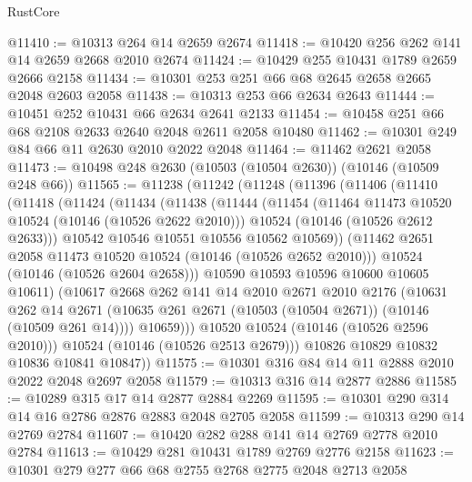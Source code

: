\begin{lexlean}{RustCore}
\begin{coremodule}
@11410 := @10313 @264 @14 @2659 @2674
@11418 := @10420 @256 @262 @141 @14 @2659 @2668 @2010 @2674
@11424 := @10429 @255 @10431 @1789 @2659 @2666 @2158
@11434 := @10301 @253 @251 @66 @68 @2645 @2658 @2665 @2048 @2603 @2058
@11438 := @10313 @253 @66 @2634 @2643
@11444 := @10451 @252 @10431 @66 @2634 @2641 @2133
@11454 := @10458 @251 @66 @68 @2108 @2633 @2640 @2048 @2611 @2058 @10480
@11462 := @10301 @249 @84 @66 @11 @2630 @2010 @2022 @2048
@11464 := @11462 @2621 @2058
@11473 := @10498 @248 @2630 (@10503 (@10504 @2630)) (@10146 (@10509 @248 @66))
@11565 := @11238
    (@11242
      (@11248
        (@11396
          (@11406
            (@11410
              (@11418
                (@11424
                  (@11434
                    (@11438
                      (@11444
                        (@11454
                          (@11464 @11473 @10520 @10524 (@10146 (@10526 @2622 @2010)))
                          @10524
                          (@10146 (@10526 @2612 @2633)))
                        @10542
                        @10546
                        @10551
                        @10556
                        @10562
                        @10569))
                    (@11462 @2651 @2058 @11473 @10520 @10524 (@10146 (@10526 @2652 @2010)))
                    @10524
                    (@10146 (@10526 @2604 @2658)))
                  @10590
                  @10593
                  @10596
                  @10600
                  @10605
                  @10611)
                (@10617
                  @2668
                  @262
                  @141
                  @14
                  @2010
                  @2671
                  @2010
                  @2176
                  (@10631
                    @262
                    @14
                    @2671
                    (@10635 @261 @2671 (@10503 (@10504 @2671)) (@10146 (@10509 @261 @14))))
                  @10659)))
            @10520
            @10524
            (@10146 (@10526 @2596 @2010)))
          @10524
          (@10146 (@10526 @2513 @2679)))
        @10826
        @10829
        @10832
        @10836
        @10841
        @10847))
@11575 := @10301 @316 @84 @14 @11 @2888 @2010 @2022 @2048 @2697 @2058
@11579 := @10313 @316 @14 @2877 @2886
@11585 := @10289 @315 @17 @14 @2877 @2884 @2269
@11595 := @10301 @290 @314 @14 @16 @2786 @2876 @2883 @2048 @2705 @2058
@11599 := @10313 @290 @14 @2769 @2784
@11607 := @10420 @282 @288 @141 @14 @2769 @2778 @2010 @2784
@11613 := @10429 @281 @10431 @1789 @2769 @2776 @2158
@11623 := @10301 @279 @277 @66 @68 @2755 @2768 @2775 @2048 @2713 @2058

\end{coremodule}
\end{lexlean}
